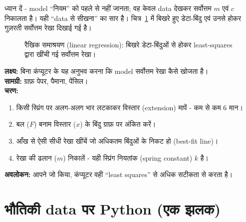 ध्यान दें - model “नियम” को पहले से नहीं जानता; वह केवल data देखकर सर्वोत्तम $m$ एवं
$c$ निकालता है। यही “data से सीखना” का सार है। चित्र~\ref{fig:regression} में बिखरे
हुए डेटा-बिंदु एवं उनसे होकर गुज़रती सर्वोत्तम रेखा दिखाई गई है।

\begin{figure}[h]
\centering
{}
\caption{रैखिक समाश्रयण (linear regression): बिखरे डेटा-बिंदुओं से होकर least-squares
द्वारा खींची गई सर्वोत्तम रेखा।}
\label{fig:regression}
\end{figure}

\begin{gatividhi}[हाथ से “regression” - सर्वोत्तम रेखा]
\textbf{लक्ष्य:} बिना कंप्यूटर के यह अनुभव करना कि model सर्वोत्तम रेखा कैसे खोजता है।\\[4pt]
\textbf{सामग्री:} ग्राफ़ पेपर, पैमाना, पेंसिल।\\[4pt]
\textbf{चरण:}
\begin{enumerate}[leftmargin=1.6em]
  \item किसी स्प्रिंग पर अलग-अलग भार लटकाकर विस्तार (extension) मापें - कम से कम 6 मान।
  \item बल ($F$) बनाम विस्तार ($x$) के बिंदु ग्राफ़ पर अंकित करें।
  \item आँख से ऐसी सीधी रेखा खींचें जो अधिकतम बिंदुओं के निकट हो (best-fit line)।
  \item रेखा की ढलान ($m$) निकालें - यही स्प्रिंग नियतांक (spring constant) $k$ है।
\end{enumerate}
\textbf{अवलोकन:} आपने जो किया, कंप्यूटर वही “least squares” से अधिक सटीकता से करता है।
\end{gatividhi}

\section{भौतिकी data पर Python (एक झलक)}

